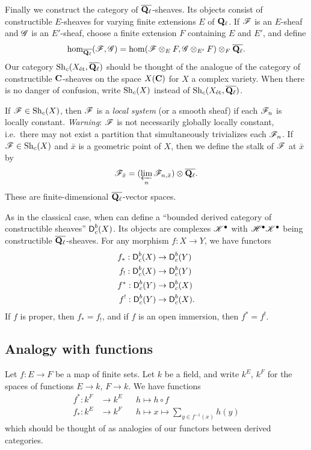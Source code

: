 \documentclass{article}
\begin{document}
Finally we construct the category of $\overline{\mathbf{Q}_\ell}$-sheaves. Its 
objects consist of constructible $E$-sheaves for varying finite extensions $E$ of 
$\mathbf{Q}_\ell$. If $\mathscr{F}$ is an $E$-sheaf and $\mathscr{G}$ is an $E'$-sheaf, choose a finite 
extension $F$ containing $E$ and $E'$, and define 
\[
  \hom_{\overline{\mathbf{Q}_\ell}}(\mathscr{F},\mathscr{G}) = \hom(\mathscr{F}\otimes_E F,\mathscr{G}\otimes_{E'} F)\otimes_F \overline{\mathbf{Q}_\ell} .
\]
Our category $\operatorname{Sh}_c(X_{\textnormal{\'et}},\overline{\mathbf{Q}_\ell})$ should be thought of the 
analogue of the category of constructible $\mathbf{C}$-sheaves on the space $X(\mathbf{C})$ for 
$X$ a complex variety. When there is no danger of confusion, write $\operatorname{Sh}_c(X)$ 
instead of $\operatorname{Sh}_c(X_{\textnormal{\'et}},\overline{\mathbf{Q}_\ell})$. 

If $\mathscr{F}\in \operatorname{Sh}_c(X)$, then $\mathscr{F}$ is a \emph{local system} (or a smooth sheaf) if 
each $\mathscr{F}_n$ is locally constant. \emph{Warning}: $\mathscr{F}$ is not necessarily globally 
locally constant, i.e.\ there may not exist a partition that simultaneously 
trivializes each $\mathscr{F}_n$. If $\mathscr{F}\in \operatorname{Sh}_c(X)$ and $\bar x$ is a geometric point 
of $X$, then we define the stalk of $\mathscr{F}$ at $\bar x$ by 
\[
  \mathscr{F}_{\bar x} = (\varprojlim_n \mathscr{F}_{n,\bar x})\otimes \overline{\mathbf{Q}_\ell} .
\]
These are finite-dimensional $\overline{\mathbf{Q}_\ell}$-vector spaces. 

As in the classical case, when can define a ``bounded derived category of 
constructible sheaves'' $\operatorname{\mathsf{D}}_c^b(X)$. Its objects are complexes 
$\mathscr{K}^\bullet$ with $\mathscr{H}^\bullet\mathscr{K}^\bullet$ being constructible 
$\overline{\mathbf{Q}_\ell}$-sheaves. 
For any morphism $f:X\to Y$, we have functors 
\begin{align*}
  f_\ast:\operatorname{\mathsf{D}}_c^b(X) &\to \operatorname{\mathsf{D}}_c^b(Y) \\
  f_! : \operatorname{\mathsf{D}}_c^b(X) &\to \operatorname{\mathsf{D}}_c^b(Y) \\
  f^\ast : \operatorname{\mathsf{D}}_c^b(Y) &\to \operatorname{\mathsf{D}}_c^b(X) \\
  f^!:\operatorname{\mathsf{D}}_c^b(Y) &\to \operatorname{\mathsf{D}}_c^b(X) .
\end{align*}
If $f$ is proper, then $f_\ast=f_!$, and if $f$ is an open immersion, then 
$f^\ast=f^!$. 


\subsection{Analogy with functions}

Let $f:E\to F$ be a map of finite sets. Let $k$ be a field, and write 
$k^E$, $k^F$ for the spaces of functions $E\to k$, $F\to k$. We have functions 
\begin{align*}
  f^\ast:k^F &\to k^E && h\mapsto h\circ f \\
  f_\ast:k^E &\to k^F && h\mapsto x\mapsto \sum_{y\in f^{-1}(x)} h(y)
\end{align*}
which should be thought of as analogies of our functors between derived 
categories. 
\end{document}
